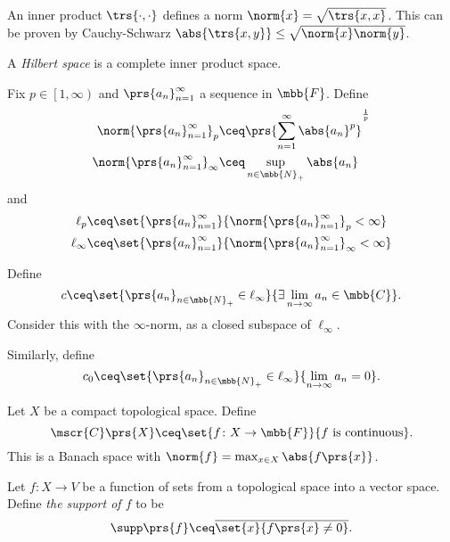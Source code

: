 \documentclass[10pt, twoside]{book}
\begin{document}
\begin{remark}
An inner product $\trs{\cdot, \cdot}$ defines a norm $\norm{x} = \sqrt{\trs{x,x}}$. This can be proven by Cauchy-Schwarz $\abs{\trs{x,y}} \leq \sqrt{\norm{x} \norm{y}}$.
\end{remark}

\begin{definition}
A \emph{Hilbert space} is a complete inner product space.
\end{definition}

\begin{example}
Fix $p \in \left[1, \infty \right)$ and $\prs{a_n}_{n=1}^{\infty}$ a sequence in $\mbb{F}$. Define
\begin{align*}
\norm{\prs{a_n}_{n=1}^{\infty}}_p &\ceq \prs{\sum_{n=1}^{\infty} \abs{a_n}^p}^{\frac{1}{p}} \\
\norm{\prs{a_n}_{n=1}^{\infty}}_\infty &\ceq \sup_{n \in \mbb{N}_+} \abs{a_n}
\end{align*}
and
\begin{align*}
\ell_p &\ceq \set{\prs{a_n}_{n=1}^{\infty}}{\norm{\prs{a_n}_{n = 1}^{\infty}}_p < \infty} \\
\ell_\infty &\ceq \set{\prs{a_n}_{n=1}^{\infty}}{\norm{\prs{a_n}_{n=1}^{\infty}}_\infty < \infty}
\end{align*}
\end{example}

\begin{example}
Define
\[c \ceq \set{\prs{a_n}_{n \in \mbb{N}_+} \in \ell_\infty}{\exists \lim_{n \to \infty} a_n \in \mbb{C}} \text{.}\]
Consider this with the $\infty$-norm, as a closed subspace of $\ell_\infty$.

Similarly, define
\[c_0 \ceq \set{\prs{a_n}_{n \in \mbb{N}_+} \in \ell_\infty}{\lim_{n \to \infty} a_n = 0} \text{.}\]
\end{example}

\begin{example}
Let $X$ be a compact topological space.
Define
\[\mscr{C}\prs{X} \ceq \set{f \colon X \to \mbb{F}}{f \text{ is continuous}} \text{.}\]
This is a Banach space with $\norm{f} = \max_{x \in X} \abs{f\prs{x}}$.
\end{example}

\begin{definition}
Let $f \colon X \to V$ be a function of sets from a topological space into a vector space. Define \emph{the support of $f$} to be
\[\supp \prs{f} \ceq \overline{\set{x}{f\prs{x} \neq 0}} \text{.}\]
\end{definition}
\end{document}
